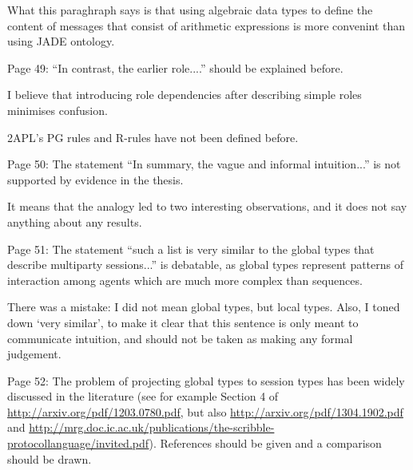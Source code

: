 \documentclass{article}
\newcommand{\todo}[1]{[\textcolor{green}{TODO}: #1]}
\newenvironment{them}{\noindent\begingroup\color{blue}}{\endgroup\par}
\begin{document}
What this paraghraph says is that using algebraic data types to define the
content of messages that consist of arithmetic expressions is more convenint
than using JADE ontology.

\begin{them}

Page 49:
``In contrast, the earlier role....'' should be explained before.
\end{them}
I believe that introducing role dependencies after describing simple roles
minimises confusion.

\begin{them}

2APL's PG rules and R-rules have not been defined before.
\end{them}
\todo{define 2APL`s rules}

\begin{them}

Page 50:
The statement ``In summary, the vague and informal intuition...'' is not
supported by evidence in the thesis.

\end{them}
It means that the analogy led to two interesting observations, and it does not
say anything about any results.

\begin{them}

Page 51:
The statement ``such a list is very similar to the global types that describe
multiparty sessions...'' is debatable, as global types represent patterns of
interaction among agents which are much more complex than sequences.

\end{them}

There was a mistake: I did not mean global types, but local types.
Also, I toned down `very similar',
  to make it clear that this sentence is only meant to communicate intuition,
and should not be taken as making any formal judgement.


\begin{them}

Page 52:
The problem of projecting global types to session types has been widely
discussed in the literature (see for example Section 4 of
\url{http://arxiv.org/pdf/1203.0780.pdf}, but also
\url{http://arxiv.org/pdf/1304.1902.pdf} and
\url{http://mrg.doc.ic.ac.uk/publications/the-scribble-protocollanguage/invited.pdf}).
References should be given and a comparison should be drawn.

\end{them}
\end{document}
